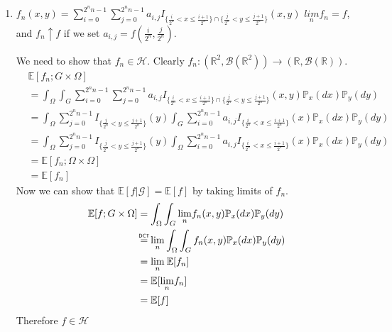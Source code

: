 \documentclass[12pt, letterpaper]{article}
\newcommand\myeq{\mathrel{\overset{\makebox[0pt]{\mbox{\normalfont\tiny\sffamily DCT}}}{=}}}
\begin{document}
\begin{enumerate} [label = \textbf{\alph*)}]
	\newpage

	\item  $f_n(x, y) = \sum_{i = 0}^{2^nn - 1}\sum_{j = 0}^{2^nn-1} a_{i, j} I_{\{\frac{i}{2^n} < x \leq \frac{i + 1}{2^n}\}\cap \{\frac{j}{2^n} < y \leq \frac{j+1}{2^n}\}}(x, y)$ \newline
	$\underset{n}{lim}f_n = f$, and $f_n \uparrow f$ if we set $a_{i,j} = f(\frac{i}{2^n}, \frac{j}{2^n})$.
	
	We need to show that $f_n \in \mathcal{H}$. Clearly $f_n: (\mathbb{R}^2, \mathcal{B}(\mathbb{R}^2)) \rightarrow (\mathbb{R}, \mathcal{B}(\mathbb{R}))$.
	\begin{align*}
		& \mathbb{E}[f_n; G\times \Omega] \\
		& = \int_\Omega\int_G \sum_{i = 0}^{2^nn - 1}\sum_{j = 0}^{2^nn-1} a_{i, j} I_{\{\frac{i}{2^n} < x \leq \frac{i + 1}{2^n}\}\cap \{\frac{j}{2^n} < y \leq \frac{j+1}{2^n}\}}(x, y) \mathbb{P}_x (dx) \mathbb{P}_y (dy) \\
		& = \int_\Omega \sum_{j = 0}^{2^nn-1} I_{\{\frac{j}{2^n} < y \leq \frac{j+1}{2^n}\}} (y)\int_G \sum_{i = 0}^{2^nn - 1} a_{i, j} I_{\{\frac{i}{2^n} < x \leq \frac{i + 1}{2^n}\}}(x) \mathbb{P}_x (dx) \mathbb{P}_y (dy) \\
		& = \int_\Omega \sum_{j = 0}^{2^nn-1} I_{\{\frac{j}{2^n} < y \leq \frac{j+1}{2^n}\}} (y)\int_\Omega \sum_{i = 0}^{2^nn - 1} a_{i, j} I_{\{\frac{i}{2^n} < x \leq \frac{i + 1}{2^n}\}}(x) \mathbb{P}_x (dx) \mathbb{P}_y (dy) \tag{$x \in G$}\\
		& = \mathbb{E}[f_n;\Omega \times \Omega] \\
		& = \mathbb{E}[f_n]
	\end{align*}
	Now we can show that $\mathbb{E}[f|\mathcal{G}] = \mathbb{E}[f]$ by taking limits of $f_n$.	
	\begin{align*}
		\mathbb{E}[f;G \times \Omega] & = \int_\Omega	\int_G \underset{n}{\lim}f_n (x, y) \mathbb{P}_x (dx) \mathbb{P}_y (dy) \\
		& \myeq \underset{n}{\lim} \int_\Omega \int_G f_n (x, y) \mathbb{P}_x (dx) \mathbb{P}_y (dy) \\
		& =  \underset{n}{\lim} \: \mathbb{E}[f_n] \\
		& = \mathbb{E}[ \underset{n}{\lim} f_n] \\
		& = \mathbb{E}[f]
	\end{align*}
	Therefore $f \in \mathcal{H}$
	

\end{enumerate}
\end{document}
